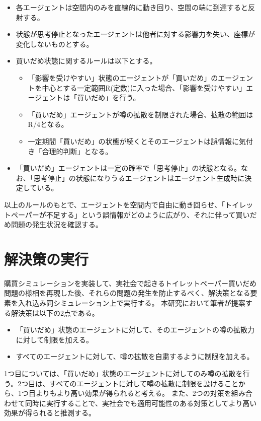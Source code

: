 \begin{itemize}
  \item 各エージェントは空間内のみを直線的に動き回り、空間の端に到達すると反射する。
  \item 状態が思考停止となったエージェントは他者に対する影響力を失い、座標が変化しないものとする。
  \item 買いだめ状態に関するルールは以下とする。
  \begin{itemize}
    \item 「影響を受けやすい」状態のエージェントが「買いだめ」のエージェントを中心とする一定範囲R(定数)に入った場合、「影響を受けやすい」エージェントは「買いだめ」を行う。
    \item 「買いだめ」エージェントが噂の拡散を制限された場合、拡散の範囲はR/4となる。
    \item 一定期間「買いだめ」の状態が続くとそのエージェントは誤情報に気付き「合理的判断」となる。
  \end{itemize}  
  \item 「買いだめ」エージェントは一定の確率で「思考停止」の状態となる。なお、「思考停止」の状態になりうるエージェントはエージェント生成時に決定している。
\end{itemize}

以上のルールのもとで、エージェントを空間内で自由に動き回らせ、「トイレットペーパーが不足する」という誤情報がどのように広がり、それに伴って買いだめ問題の発生状況を確認する。

\section{解決策の実行}
購買シミュレーションを実装して、実社会で起きるトイレットペーパー買いだめ問題の様相を再現した後、それらの問題の発生を防止するべく、解決策となる要素を入れ込み同シミュレーション上で実行する。
本研究において筆者が提案する解決策は以下の2点である。

\begin{itemize}
  \item 「買いだめ」状態のエージェントに対して、そのエージェントの噂の拡散力に対して制限を加える。
  \item すべてのエージェントに対して、噂の拡散を自粛するように制限を加える。
\end{itemize}

1つ目については、「買いだめ」状態のエージェントに対してのみ噂の拡散を行う。2つ目は、すべてのエージェントに対して噂の拡散に制限を設けることから、1つ目よりもより高い効果が得られると考える。
また、2つの対策を組み合わせて同時に実行することで、実社会でも適用可能性のある対策としてより高い効果が得られると推測する。


